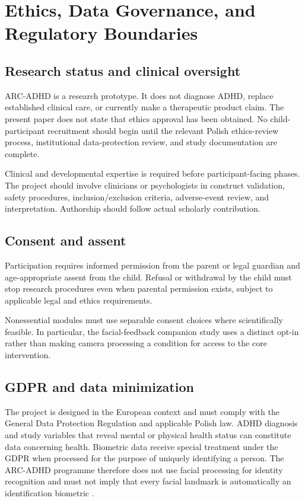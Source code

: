 \section{Ethics, Data Governance, and Regulatory Boundaries}

\subsection{Research status and clinical oversight}

ARC-ADHD is a research prototype. It does not diagnose ADHD, replace established clinical care, or currently make a therapeutic product claim. The present paper does not state that ethics approval has been obtained. No child-participant recruitment should begin until the relevant Polish ethics-review process, institutional data-protection review, and study documentation are complete.

Clinical and developmental expertise is required before participant-facing phases. The project should involve clinicians or psychologists in construct validation, safety procedures, inclusion/exclusion criteria, adverse-event review, and interpretation. Authorship should follow actual scholarly contribution.

\subsection{Consent and assent}

Participation requires informed permission from the parent or legal guardian and age-appropriate assent from the child. Refusal or withdrawal by the child must stop research procedures even when parental permission exists, subject to applicable legal and ethics requirements.

Nonessential modules must use separable consent choices where scientifically feasible. In particular, the facial-feedback companion study uses a distinct opt-in rather than making camera processing a condition for access to the core intervention.

\subsection{GDPR and data minimization}

The project is designed in the European context and must comply with the General Data Protection Regulation and applicable Polish law. ADHD diagnosis and study variables that reveal mental or physical health status can constitute data concerning health. Biometric data receive special treatment under the GDPR when processed for the purpose of uniquely identifying a person. The ARC-ADHD programme therefore does not use facial processing for identity recognition and must not imply that every facial landmark is automatically an identification biometric \parencite{eu2016gdpr}.

